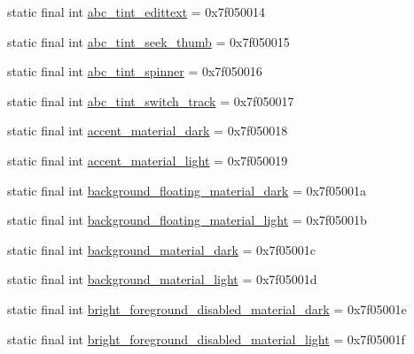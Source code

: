 \begin{DoxyCompactItemize}
\item 
static final int \mbox{\hyperlink{classandroid_1_1support_1_1design_1_1R_1_1color_a5021f35a909c1157e59005b1457ef3eb}{abc\+\_\+tint\+\_\+edittext}} = 0x7f050014
\item 
static final int \mbox{\hyperlink{classandroid_1_1support_1_1design_1_1R_1_1color_abf1956ebf569ff6729ff80b5c6fc9f53}{abc\+\_\+tint\+\_\+seek\+\_\+thumb}} = 0x7f050015
\item 
static final int \mbox{\hyperlink{classandroid_1_1support_1_1design_1_1R_1_1color_ae96cfee7b0aad4b7dcb76cbd2f9ee57a}{abc\+\_\+tint\+\_\+spinner}} = 0x7f050016
\item 
static final int \mbox{\hyperlink{classandroid_1_1support_1_1design_1_1R_1_1color_a7df7919e8ca4873050b36caa5a7b9685}{abc\+\_\+tint\+\_\+switch\+\_\+track}} = 0x7f050017
\item 
static final int \mbox{\hyperlink{classandroid_1_1support_1_1design_1_1R_1_1color_ab01ada57244e9b90a9606f32bcbe6c24}{accent\+\_\+material\+\_\+dark}} = 0x7f050018
\item 
static final int \mbox{\hyperlink{classandroid_1_1support_1_1design_1_1R_1_1color_a1d015d7a38834120bbb9174335ff1876}{accent\+\_\+material\+\_\+light}} = 0x7f050019
\item 
static final int \mbox{\hyperlink{classandroid_1_1support_1_1design_1_1R_1_1color_abeba2c742ff4f2955bd0790303e09814}{background\+\_\+floating\+\_\+material\+\_\+dark}} = 0x7f05001a
\item 
static final int \mbox{\hyperlink{classandroid_1_1support_1_1design_1_1R_1_1color_a25b077b49863d0a2e9cfeb2a82bff372}{background\+\_\+floating\+\_\+material\+\_\+light}} = 0x7f05001b
\item 
static final int \mbox{\hyperlink{classandroid_1_1support_1_1design_1_1R_1_1color_a1c87383fdb42a238b779200d8b5d3cad}{background\+\_\+material\+\_\+dark}} = 0x7f05001c
\item 
static final int \mbox{\hyperlink{classandroid_1_1support_1_1design_1_1R_1_1color_a50d50585c475903217d4d17e6838b04f}{background\+\_\+material\+\_\+light}} = 0x7f05001d
\item 
static final int \mbox{\hyperlink{classandroid_1_1support_1_1design_1_1R_1_1color_a0ea9074905ccfeecc3b032f952d0ea4e}{bright\+\_\+foreground\+\_\+disabled\+\_\+material\+\_\+dark}} = 0x7f05001e
\item 
static final int \mbox{\hyperlink{classandroid_1_1support_1_1design_1_1R_1_1color_a776883b09016b4f837ed279284e8f16a}{bright\+\_\+foreground\+\_\+disabled\+\_\+material\+\_\+light}} = 0x7f05001f

\end{DoxyCompactItemize}
